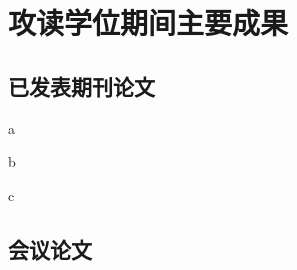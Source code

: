 
\chapter*{攻读学位期间主要成果}
\section*{已发表期刊论文}
\begin{enumerate}[{[}1{]}]
	\item a
	\item b
	\item c
\end{enumerate}


\section*{会议论文}




